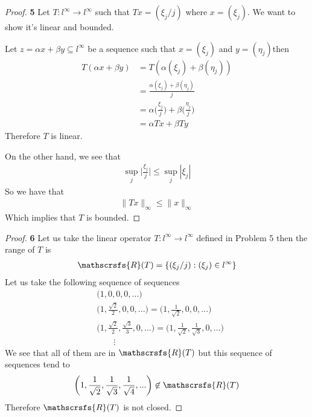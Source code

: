 \documentclass[11pt]{article}
\newcommand{\range}{\mathscrsfs{R}}
\theoremstyle{definition}
\begin{document}
\begin{proof}{\textbf{5}}
    Let $T: l^\infty \to l^\infty$ such that $Tx = (\xi_j/j)$ where
    $x = (\xi_j)$. We want to show it's linear and bounded.

    Let $z = \alpha x + \beta y \subseteq l^\infty$ be a sequence such that
    $x= (\xi_j)$ and $y = (\eta_j)$then
    \begin{align*}
        T(\alpha x + \beta y) &= T(\alpha(\xi_j) + \beta(\eta_j))\\
            &=\frac{\alpha(\xi_j) + \beta(\eta_j)}{j}\\
            &=\alpha\bigg(\frac{\xi_j}{j}\bigg) + \beta\bigg(\frac{\eta_j}{j}\bigg)\\
            &=\alpha Tx + \beta Ty 
    \end{align*}
    Therefore $T$ is linear.

    On the other hand, we see that
    \begin{align*}
        \sup_j \bigg|\frac{\xi_j}{j}\bigg| \leq \sup_j |\xi_j|
    \end{align*}
    So we have that
    \begin{align*}
        \|Tx\|_\infty \leq \|x\|_\infty
    \end{align*}
    Which implies that $T$ is bounded.    
\end{proof}
\cleardoublepage
\begin{proof}{\textbf{6}}
    Let us take the linear operator $T:l^\infty \to l^\infty$ defined in
    Problem 5 then the range of $T$ is
    \begin{align*}
        \range(T) = \{(\xi_j/j) : (\xi_j) \in l^\infty\}
    \end{align*}
    Let us take the following sequence of sequences
    \begin{align*}
        &\bigg(1, 0, 0, 0, ...\bigg)\\
        &\bigg(1, \frac{\sqrt{2}}{2}, 0, 0, ...\bigg)
        = \bigg(1, \frac{1}{\sqrt{2}}, 0, 0, ...\bigg)\\
        &\bigg(1, \frac{\sqrt{2}}{2}, \frac{\sqrt{3}}{3}, 0, ...\bigg)
        = \bigg(1, \frac{1}{\sqrt{2}}, \frac{1}{\sqrt{3}}, 0, ...\bigg)\\
        & \qquad\vdots
    \end{align*}
    We see that all of them are in $\range(T)$ but this sequence of
    sequences tend to
    $$\bigg(1, \frac{1}{\sqrt{2}}, \frac{1}{\sqrt{3}}, \frac{1}{\sqrt{4}},
    ...\bigg) \not \in \range(T)$$
    Therefore $\range(T)$ is not closed.
\end{proof}
\end{document}
